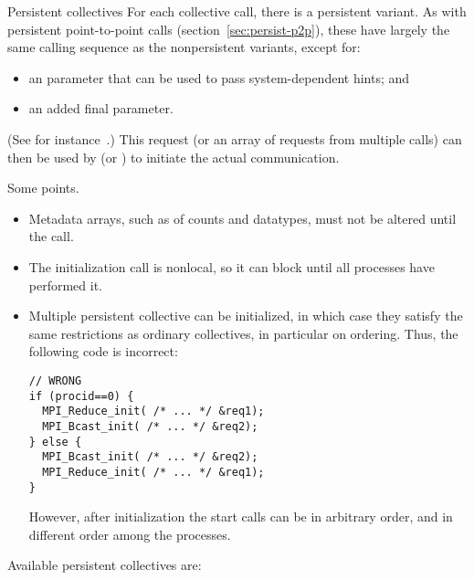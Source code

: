 \begin{mpifournote}{Persistent collectives}
For each collective call, there is a persistent variant.
As with persistent point-to-point calls (section~\ref{sec:persist-p2p}),
these have largely the same calling sequence as the nonpersistent variants,
except for:
\begin{itemize}
\item an  parameter that can be used to pass
  system-dependent hints; and
\item
  an added final  parameter.
\end{itemize}
(See for instance~.)
This request (or an array of requests from multiple calls) can then be used by
 (or )
to initiate the actual communication.


Some points.
\begin{itemize}
\item
  Metadata arrays, such as of counts and datatypes,
  must not be altered until the  call.
\item The initialization call is nonlocal, so it can block until all
  processes have performed it.
\item Multiple persistent collective can be initialized, in which case
  they satisfy the same restrictions as ordinary collectives, in particular
  on ordering. Thus, the following code is incorrect:
\begin{lstlisting}
// WRONG
if (procid==0) {
  MPI_Reduce_init( /* ... */ &req1);
  MPI_Bcast_init( /* ... */ &req2);
} else {
  MPI_Bcast_init( /* ... */ &req2);
  MPI_Reduce_init( /* ... */ &req1);
}
\end{lstlisting}
However, after initialization the start calls can be in arbitrary order,
and in different order among the processes.
\end{itemize}

\begin{raggedlist} %
  Available persistent collectives are:
\end{raggedlist} %

\end{mpifournote}

